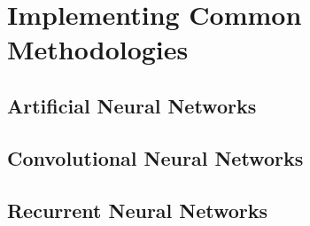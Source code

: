 \chapter{Implementing Common Methodologies}

\section{Artificial Neural Networks}

\section{Convolutional Neural Networks}

\section{Recurrent Neural Networks}